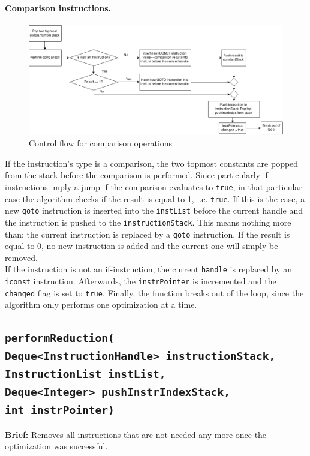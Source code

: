 \paragraph{Comparison instructions.}
\begin{figure}[h!]
\centering
\includegraphics[scale=0.45]{figures/comparison}
\caption{Control flow for comparison operations}
\end{figure}

If the instruction’s type is a comparison, the two topmost constants are popped from the stack before the comparison is performed. Since particularly if-instructions imply a jump if the comparison evaluates to \texttt{true}, in that particular case the algorithm checks if the result is equal to 1, i.e. \texttt{true}. If this is the case, a new \texttt{goto} instruction is inserted into the \texttt{instList} before the current handle and the instruction is pushed to the \texttt{instructionStack}. This means nothing more than: the current instruction is replaced by a \texttt{goto} instruction. If the result is equal to 0, no new instruction is added and the current one will simply be removed.\\
If the instruction is not an if-instruction, the current \texttt{handle} is replaced by an \texttt{iconst} instruction. Afterwards, the \texttt{instrPointer} is incremented and the \texttt{changed} flag is set to \texttt{true}. Finally, the function breaks out of the loop, since the algorithm only performs one optimization at a time.

\subsection{\texttt{performReduction(\\
\hspace{2cm}Deque<InstructionHandle> instructionStack, \\
\hspace{2cm}InstructionList instList, \\
\hspace{2cm}Deque<Integer> pushInstrIndexStack, \\
\hspace{2cm}int instrPointer)}}
\label{subsec:performreduction}
\textbf{Brief: }Removes all instructions that are not needed any more once the optimization was successful. \\

